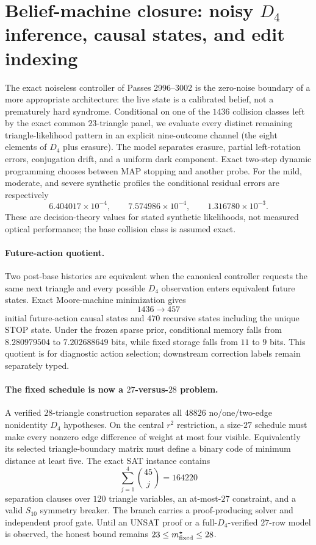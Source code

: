 \section*{Belief-machine closure: noisy $D_4$ inference, causal states, and edit indexing}

The exact noiseless controller of Passes 2996--3002 is the zero-noise boundary of a more
appropriate architecture: the live state is a calibrated belief, not a prematurely hard
syndrome.  Conditional on one of the $1436$ collision classes left by the exact common
$23$-triangle panel, we evaluate every distinct remaining triangle-likelihood pattern in
an explicit nine-outcome channel (the eight elements of $D_4$ plus erasure).  The model
separates erasure, partial left-rotation errors, conjugation drift, and a uniform dark
component.  Exact two-step dynamic programming chooses between MAP stopping and another
probe.  For the mild, moderate, and severe synthetic profiles the conditional residual
errors are respectively
\[
6.404017\times10^{-4},\qquad7.574986\times10^{-4},\qquad1.316780\times10^{-3}.
\]
These are decision-theory values for stated synthetic likelihoods, not measured optical
performance; the base collision class is assumed exact.

\paragraph{Future-action quotient.}
Two post-base histories are equivalent when the canonical controller requests the same
next triangle and every possible $D_4$ observation enters equivalent future states.  Exact
Moore-machine minimization gives
\[
1436\longrightarrow457
\]
initial future-action causal states and $470$ recursive states including the unique STOP
state.  Under the frozen sparse prior, conditional memory falls from
$8.280979504$ to $7.202688649$ bits, while fixed storage falls from $11$ to $9$ bits.
This quotient is for diagnostic action selection; downstream correction labels remain
separately typed.

\paragraph{The fixed schedule is now a $27$-versus-$28$ problem.}
A verified $28$-triangle construction separates all $48826$ no/one/two-edge nonidentity
$D_4$ hypotheses.  On the central $r^2$ restriction, a size-$27$ schedule must make every
nonzero edge difference of weight at most four visible.  Equivalently its selected
triangle-boundary matrix must define a binary code of minimum distance at least five.  The
exact SAT instance contains
\[
\sum_{j=1}^{4}{45\choose j}=164220
\]
separation clauses over $120$ triangle variables, an at-most-$27$ constraint, and a valid
$S_{10}$ symmetry breaker.  The branch carries a proof-producing solver and independent
proof gate.  Until an UNSAT proof or a full-$D_4$-verified $27$-row model is observed, the
honest bound remains $23\le m^\star_{\rm fixed}\le28$.

